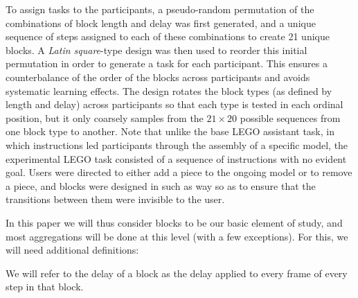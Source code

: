 \documentclass[10pt,letterpaper]{article}
\begin{document}
To assign tasks to the participants, a pseudo-random permutation of the combinations of block length and delay was first generated, and a unique sequence of steps assigned to each of these combinations to create 21 unique blocks.
A \emph{Latin square}-type design was then used to reorder this initial permutation in order to generate a task for each participant.
This ensures a counterbalance of the order of the blocks across participants and avoids systematic learning effects. 
The design rotates the block types (as defined by length and delay) across participants so that each type is tested in each ordinal position, but it only coarsely samples from the \( 21 \times 20 \) possible sequences from one block type to another.
Note that unlike the base LEGO assistant task, in which instructions led participants through the assembly of a specific model, the experimental LEGO task consisted of a sequence of instructions with no evident goal.
Users were directed to either add a piece to the ongoing model or to remove a piece, and blocks were designed in such as way so as to ensure that the transitions between them were invisible to the user. 

In this paper we will thus consider blocks to be our basic element of study, and most aggregations will be done at this level (with a few exceptions).
For this, we will need additional definitions:

\begin{definition}
  We will refer to the delay of a block as the delay applied to every frame of every step in that block.
\end{definition}
\end{document}
